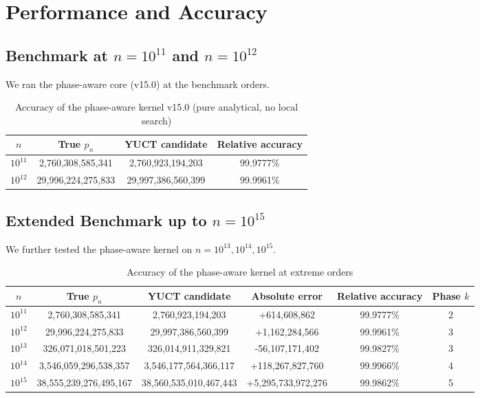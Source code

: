 \documentclass[12pt,a4paper]{article}
\theoremstyle{remark}
\begin{document}
	\section{Performance and Accuracy}
	
	\subsection{Benchmark at \(n=10^{11}\) and \(n=10^{12}\)}
	
	We ran the phase-aware core (v15.0) at the benchmark orders.
	
	\begin{table}[H]
		\centering
		\caption{Accuracy of the phase-aware kernel v15.0 (pure analytical, no local search)}
		\label{tab:benchmark-v15}
		\begin{tabular}{cccc}
			\toprule
			\(n\) & True \(p_n\) & YUCT candidate & Relative accuracy \\
			\midrule
			\(10^{11}\) & 2,760,308,585,341 & 2,760,923,194,203 & 99.9777\% \\
			\(10^{12}\) & 29,996,224,275,833 & 29,997,386,560,399 & 99.9961\% \\
			\bottomrule
		\end{tabular}
	\end{table}
	
	\subsection{Extended Benchmark up to \(n=10^{15}\)}
	
	We further tested the phase-aware kernel on \(n = 10^{13}, 10^{14}, 10^{15}\).
	
	\begin{table}[H]
		\centering
		\caption{Accuracy of the phase-aware kernel at extreme orders}
		\label{tab:benchmark-extreme}
		\begin{tabular}{cccccc}
			\toprule
			\(n\) & True \(p_n\) & YUCT candidate & Absolute error & Relative accuracy & Phase \(k\) \\
			\midrule
			\(10^{11}\) & 2,760,308,585,341 & 2,760,923,194,203 & +614,608,862 & 99.9777\% & 2 \\
			\(10^{12}\) & 29,996,224,275,833 & 29,997,386,560,399 & +1,162,284,566 & 99.9961\% & 3 \\
			\(10^{13}\) & 326,071,018,501,223 & 326,014,911,329,821 & -56,107,171,402 & 99.9827\% & 3 \\
			\(10^{14}\) & 3,546,059,296,538,357 & 3,546,177,564,366,117 & +118,267,827,760 & 99.9966\% & 4 \\
			\(10^{15}\) & 38,555,239,276,495,167 & 38,560,535,010,467,443 & +5,295,733,972,276 & 99.9862\% & 5 \\
			\bottomrule
		\end{tabular}
	\end{table}
	
\end{document}
